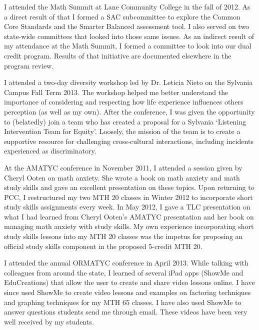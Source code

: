 \begin{description}[style=nextline]
	\item[Steve Simonds (Faculty Chair, Sylvania Campus)]
	I attended the Math Summit at Lane Community College in the fall of 2012.  As a
	direct result of that I formed a SAC subcommittee to explore the Common Core
	Standards and the Smarter Balanced assessment tool.  I also served on two
	state-wide committees that looked into those same issues.  As an indirect
	result of my attendance at the Math Summit, I formed a committee to look into
	our dual credit program.  Results of that initiative are documented elsewhere
	in the program review.

	I attended a two-day diversity workshop led by Dr. Leticia Nieto on the
	Sylvania Campus Fall Term 2013.  The workshop helped me better understand the
	importance of considering and respecting how life experience influences others
	perception (as well as my own). After the conference, I was given the
	opportunity to (belatedly) join a team who has created a proposal for a
	Sylvania `Listening Intervention Team for Equity'. Loosely, the mission
	of the team is to create a supportive resource for challenging cross-cultural
	interactions, including incidents experienced as discriminatory.

	\item[Virginia Somes (Full-time Instructor, Cascade Campus)]
	At the AMATYC conference in November 2011, I attended a session given by Cheryl 
	Ooten on math anxiety.  She wrote a book on math anxiety and math study skills and 
	gave an excellent presentation on these topics.  Upon
	returning to PCC, I restructured my two MTH 20 classes in Winter 2012 to
	incorporate short study skills assignments every week.  In May 2012, I gave a
	TLC presentation on what I had learned from Cheryl Ooten's AMATYC
	presentation and her book on managing math anxiety with study skills.  My own
	experience incorporating short study skills lessons into my MTH 20 classes was
	the impetus for proposing an official study skills component in the proposed
	5-credit MTH 20.

	I attended the annual ORMATYC conference in April 2013.  While talking with
	colleagues from around the state, I learned of several iPad apps (ShowMe and
	EduCreations) that allow the user to create and share video lessons online.  I
	have since used ShowMe to create video lessons and examples on factoring
	techniques and graphing techniques for my MTH 65 classes.  I have also used
	ShowMe to answer questions students send me through email.  These videos have
	been very well received by my students.


\end{description}
